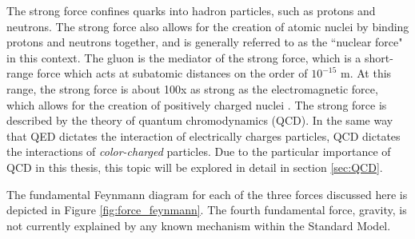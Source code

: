 The strong force confines quarks into hadron particles, such as protons and neutrons. The strong force also allows for the creation of atomic nuclei by binding protons and neutrons together, and is generally referred to as the ``nuclear force" in this context. The gluon is the mediator of the strong force, which is a short-range force which acts at subatomic distances on the order of $10^{-15}$ m. At this range, the strong force is about 100x as strong as the electromagnetic force, which allows for the creation of positively charged nuclei \cite{griffths}. The strong force is described by the theory of quantum chromodynamics (QCD). In the same way that QED dictates the interaction of electrically charges particles, QCD dictates the interactions of \textit{color-charged} particles. Due to the particular importance of QCD in this thesis, this topic will be explored in detail in section \ref{sec:QCD}. \par

The fundamental Feynmann diagram for each of the three forces discussed here is depicted in Figure \ref{fig:force_feynmann}. The fourth fundamental force, gravity, is not currently explained by any known mechanism within the Standard Model. 

